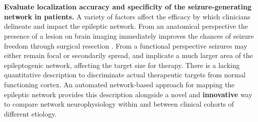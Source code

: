~\\
~\\
 \textbf{Evaluate localization accuracy and specificity of the seizure-generating network in patients.}
A variety of factors affect the efficacy by which clinicians delineate and impact the epileptic network. From an anatomical perspective the presence of a lesion on brain imaging immediately improves the chances of seizure freedom through surgical resection \cite{french2007refractory}. From a functional perspective seizures may either remain focal or secondarily spread, and implicate a much larger area of the epileptogenic network, affecting the target size for therapy. There is a lacking quantitative description to discriminate actual therapeutic targets from normal functioning cortex. An automated network-based approach for mapping the epileptic network provides this description alongside a novel and \textbf{innovative} way to compare network neurophysiology within and between clinical cohorts of different etiology.

